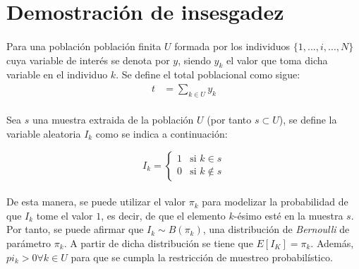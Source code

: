 \documentclass{article}
\begin{document}
	\maketitle
  \thispagestyle{empty}


  \section{Demostración de insesgadez}
  \label{sec:demostration_1}

    \paragraph{}
    Para una población población finita $U$ formada por los individuos $\{ 1, ..., i, ..., N\}$ cuya variable de interés se denota por $y$, siendo $y_k$ el valor que toma dicha variable en el individuo $k$. Se define el total poblacional como sigue:
    \begin{align}
      t &= \sum_{k \in U}y_k
    \end{align}

    \paragraph{}
    Sea $s$ una muestra extraida de la población $U$ (por tanto $s \subset U$), se define la variable aleatoria $I_k$ como se indica a continuación:

    \begin{equation}
      I_k =
      \begin{cases}
        1 & \text{si } k \in s \\
        0 & \text{si } k \not\in s
      \end{cases}
    \end{equation}

    \paragraph{}
    De esta manera, se puede utilizar el valor $\pi_k$ para modelizar la probabilidad de que $I_k$ tome el valor $1$, es decir, de que el elemento $k$-ésimo esté en la muestra $s$. Por tanto, se puede afirmar que $I_k \sim B(\pi_k)$, una distribución de \emph{Bernoulli} de parámetro $\pi_k$. A partir de dicha distribución se tiene que $E[I_K] = \pi_k$. Además, $pi_k > 0 \forall k \in U$ para que se cumpla la restricción de muestreo probabilístico.
\end{document}
